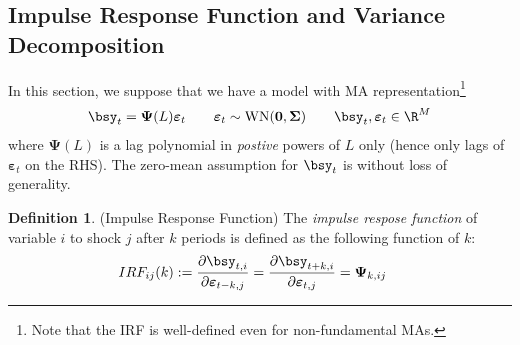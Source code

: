 \documentclass[12pt]{article}
\theoremstyle{plain}
\theoremstyle{definition}
\newtheorem{defn}[thm]{Definition}
\theoremstyle{remark}
\newcommand{\bsSigma}{\boldsymbol{\Sigma}}
\newcommand{\bsvarepsilon}{\boldsymbol{\varepsilon}}
\newcommand{\bsPsi}{\boldsymbol{\Psi}}
\renewcommand{\bso}{\boldsymbol{0}}
\newcommand{\wn}{\sim\operatorname{WN}}
\begin{document}
\clearpage
\subsection{Impulse Response Function and Variance Decomposition}

In this section, we suppose that we have a model with MA
representation\footnote{%
  Note that the IRF is well-defined even for non-fundamental MAs.
}
\begin{align*}
  \bsy_t = \bsPsi(L)\bsvarepsilon_t
  \qquad
  \bsvarepsilon_t \wn(\bso,\bsSigma)
  \qquad\bsy_t,\bsvarepsilon_t\in \R^M
\end{align*}
where $\bsPsi(L)$ is a lag polynomial in \emph{postive} powers of $L$
only (hence only lags of $\bsvarepsilon_t$ on the RHS).
The zero-mean assumption for $\bsy_t$ is without loss of generality.

\begin{defn}(Impulse Response Function)
The \emph{impulse respose function} of variable $i$ to shock $j$ after
$k$ periods is defined as the following function of $k$:
\begin{align*}
  IRF_{ij}(k)
  &:=
  \frac{\partial \bsy_{t,i}}{\partial \bsvarepsilon_{t-k,j}}
  =
  \frac{\partial \bsy_{t+k,i}}{\partial \bsvarepsilon_{t,j}}
  = \bsPsi_{k,ij}
\end{align*}
\end{defn}
\end{document}
